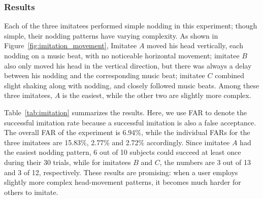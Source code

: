 \subsubsection{Results}
Each of the three imitatees performed simple nodding in this experiment; though simple, their nodding patterns have varying complexity. As shown in Figure~\ref{fig:imitation_movement}, Imitatee $A$ moved his head vertically, each nodding on a music beat, with no noticeable horizontal movement; imitatee $B$ also only moved his head in the vertical direction, but there was always a delay between his nodding and the corresponding music beat; imitatee $C$ combined slight shaking along with nodding, and closely followed music beats. Among these three imitatees, $A$ is the easiest, while the other two are slightly more complex.

Table~\ref{tab:imitation} summarizes the results. Here, we use FAR to denote the successful imitation rate because a successful imitation is also a false acceptance. The overall FAR of the experiment is 6.94\%, while the individual FARs for the three imitatees are 15.83\%, 2.77\% and 2.72\% accordingly.  Since imitatee $A$ had the easiest nodding pattern, 6 out of 10 subjects could succeed at least once during their 30 trials, while for imitatees $B$ and $C$, the numbers are  3 out of 13 and 3 of 12, respectively. These results are promising: when a user employs slightly more complex head-movement patterns, it becomes much harder for others to imitate. 



